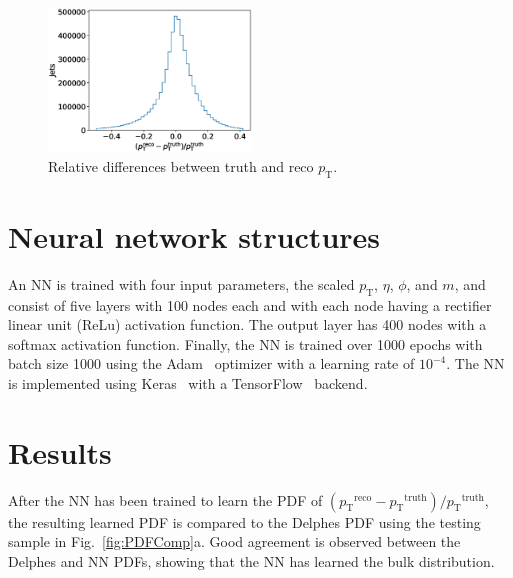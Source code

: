 \documentclass[showpacs,showkeys,preprint,prd,nofootinbib,linenumbers,12pt,superscriptaddress]{revtex4-1}
\def\pt{\ensuremath{p_{\mathrm{T}}}}
\def\ptRes{\ensuremath{(\pt^{\mathrm{reco}}-\pt^{\mathrm{truth}})/\pt^{\mathrm{truth}}}}
\begin{document}
\begin{figure}[h]
  \includegraphics[width=0.48\textwidth]{figures/nn/pTRes_nobounds_prescaling.eps}
  \caption{Relative differences between truth and reco \pt.}
  \label{fig:deltaTarget}
\end{figure}


\section{Neural network structures}

An NN is trained with four input parameters, the scaled \pt, $\eta$, $\phi$, and $m$, and consist of five layers with 100 nodes each and with each node having a rectifier linear unit (ReLu) activation function. The output layer has 400 nodes with a softmax activation function. Finally, the NN is trained over 1000 epochs with batch size 1000 using the Adam~\cite{adam} optimizer with a learning rate of $10^{-4}$. The NN is implemented using Keras~\cite{chollet2015keras} with a TensorFlow~\cite{tensorflow2015-whitepaper} backend.


\section{Results}

After the NN has been trained to learn the PDF of \ptRes, the resulting learned PDF is compared to the Delphes PDF using the testing sample in Fig.~\ref{fig:PDFComp}a. Good agreement is observed between the Delphes and NN PDFs, showing that the NN has learned the bulk distribution.
\end{document}
